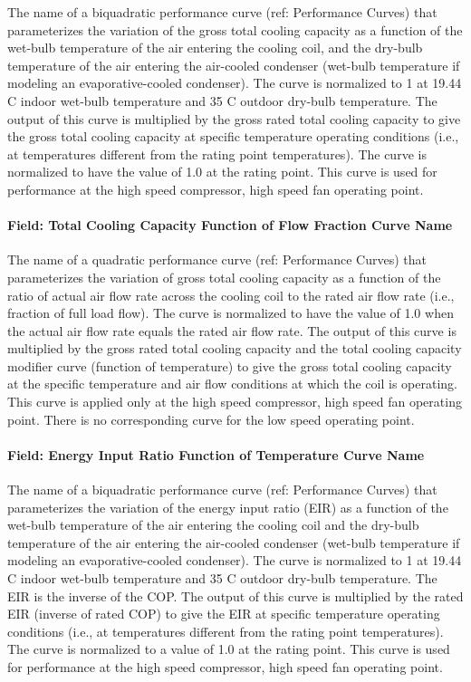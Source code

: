 The name of a biquadratic performance curve (ref: Performance Curves) that parameterizes the variation of the gross total cooling capacity as a function of the wet-bulb temperature of the air entering the cooling coil, and the dry-bulb temperature of the air entering the air-cooled condenser (wet-bulb temperature if modeling an evaporative-cooled condenser). The curve is normalized to 1 at 19.44 C indoor wet-bulb temperature and 35 C outdoor dry-bulb temperature. The output of this curve is multiplied by the gross rated total cooling capacity to give the gross total cooling capacity at specific temperature operating conditions (i.e., at temperatures different from the rating point temperatures). The curve is normalized to have the value of 1.0 at the rating point. This curve is used for performance at the high speed compressor, high speed fan operating point.

\paragraph{Field: Total Cooling Capacity Function of Flow Fraction Curve Name}\label{field-total-cooling-capacity-function-of-flow-fraction-curve-name-1}

The name of a quadratic performance curve (ref: Performance Curves) that parameterizes the variation of gross total cooling capacity as a function of the ratio of actual air flow rate across the cooling coil to the rated air flow rate (i.e., fraction of full load flow). The curve is normalized to have the value of 1.0 when the actual air flow rate equals the rated air flow rate. The output of this curve is multiplied by the gross rated total cooling capacity and the total cooling capacity modifier curve (function of temperature) to give the gross total cooling capacity at the specific temperature and air flow conditions at which the coil is operating. This curve is applied only at the high speed compressor, high speed fan operating point. There is no corresponding curve for the low speed operating point.

\paragraph{Field: Energy Input Ratio Function of Temperature Curve Name}\label{field-energy-input-ratio-function-of-temperature-curve-name-1}

The name of a biquadratic performance curve (ref: Performance Curves) that parameterizes the variation of the energy input ratio (EIR) as a function of the wet-bulb temperature of the air entering the cooling coil and the dry-bulb temperature of the air entering the air-cooled condenser (wet-bulb temperature if modeling an evaporative-cooled condenser). The curve is normalized to 1 at 19.44 C indoor wet-bulb temperature and 35 C outdoor dry-bulb temperature. The EIR is the inverse of the COP. The output of this curve is multiplied by the rated EIR (inverse of rated COP) to give the EIR at specific temperature operating conditions (i.e., at temperatures different from the rating point temperatures). The curve is normalized to a value of 1.0 at the rating point. This curve is used for performance at the high speed compressor, high speed fan operating point.

